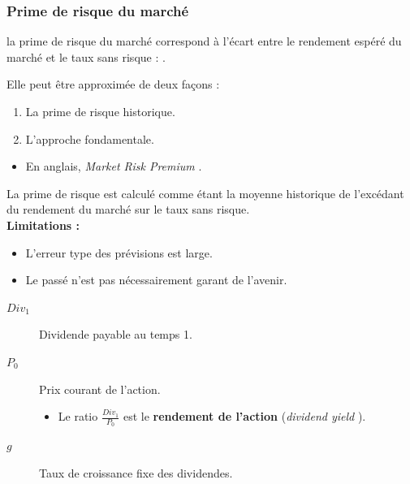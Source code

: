 \documentclass[10pt, french]{article}
\begin{document}
\begin{multicols*}{2}
\subsubsection{Prime de risque du marché}
\begin{definitionNOHFILLsub}
la prime de risque du marché correspond à l'écart entre le rendement espéré du marché et le taux sans risque : .

Elle peut être approximée de deux façons :
\begin{enumerate}
	\item	La prime de risque historique.
	\item	L'approche fondamentale.
\end{enumerate}

\begin{itemize}
	\item	En anglais, \og \textit{Market Risk Premium} \fg{}.
\end{itemize}
\end{definitionNOHFILLsub}


\begin{definitionNOHFILLprop}
La prime de risque est calculé comme étant la moyenne historique de l'excédant du rendement du marché sur le taux sans risque.\\

\textbf{Limitations :}
\begin{itemize}
	\item	L'erreur type des prévisions est large.
	\item	Le passé n'est pas nécessairement garant de l'avenir.
\end{itemize}
\end{definitionNOHFILLprop}

\begin{definitionNOHFILLprop}
\begin{distributions}[Notation]
\begin{description}
	\item[$Div_{1}$]	Dividende payable au temps 1.
	\item[$P_{0}$]	Prix courant de l'action.
		\begin{itemize}
		\item	Le ratio $\frac{Div_{1}}{P_{0}}$ est le \textbf{rendement de l'action} (\og \textit{dividend yield} \fg{}).
		\end{itemize}
	\item[$g$]	Taux de croissance fixe des dividendes.
\end{description}
\end{distributions}


\end{definitionNOHFILLprop}
\end{multicols*}
\end{document}
